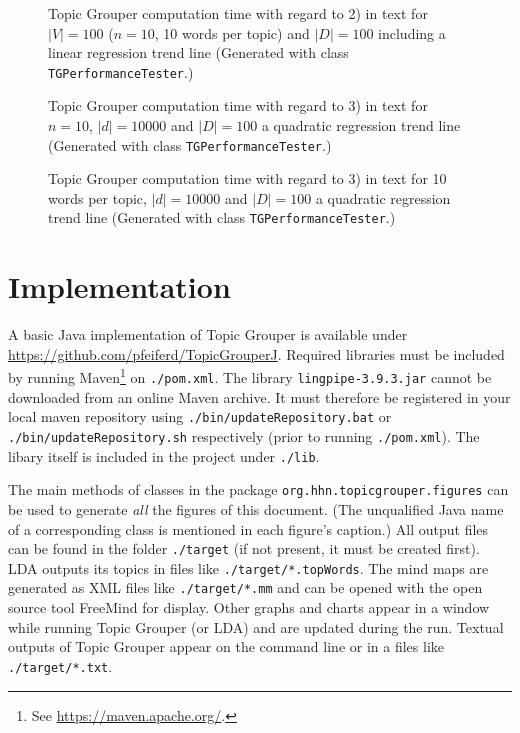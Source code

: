 \documentclass[10pt, a4paper, oneside]{article}
\begin{document}
\begin{figure}
\caption{Topic Grouper computation time with regard to 2) in text for $|V| = 100$ ($n = 10$, 10 words per topic) and $|D| = 100$ including a linear regression trend line (Generated with class \texttt{TGPerformanceTester}.)}
\label{perf1}
\end{figure}

\begin{figure}
\caption{Topic Grouper computation time with regard to 3) in text for $n = 10$, $|d| = 10000$ and $|D| = 100$ a quadratic regression trend line (Generated with class \texttt{TGPerformanceTester}.)}
\label{perf1}
\end{figure}

\begin{figure}
\caption{Topic Grouper computation time with regard to 3) in text for 10 words per topic, $|d| = 10000$ and $|D| = 100$ a quadratic regression trend line (Generated with class \texttt{TGPerformanceTester}.)}
\label{perf1}
\end{figure}

\section{Implementation}

A basic Java implementation of Topic Grouper is available under\\
\href{https://github.com/pfeiferd/TopicGrouperJ}{https://github.com/pfeiferd/TopicGrouperJ}.
Required libraries must be included by running Maven\footnote{See \href{https://maven.apache.org/}{https://maven.apache.org/}.} on \texttt{./pom.xml}. The library \texttt{lingpipe-3.9.3.jar} cannot be downloaded from an online Maven archive. It must therefore be registered in your local maven repository using \texttt{./bin/updateRepository.bat} or \texttt{./bin/updateRepository.sh} respectively (prior to running \texttt{./pom.xml}).
The libary itself is included in the project under \texttt{./lib}.

The main methods of classes in the package \texttt{org.hhn.topicgrouper.figures} can be used to generate \emph{all} the figures of this document.
(The unqualified Java name of a corresponding class is mentioned in each figure's caption.)
All output files can be found in the folder \texttt{./target} (if not present, it must be created first).
LDA outputs its topics in files like \texttt{./target/*.topWords}.
The mind maps are generated as XML files like \texttt{./target/*.mm} and can be opened with the open source tool FreeMind for display.
Other graphs and charts appear in a window while running Topic Grouper (or LDA) and are updated during the run.
Textual outputs of Topic Grouper appear on the command line or in a files like \texttt{./target/*.txt}.
\end{document}
